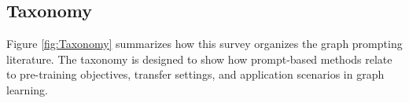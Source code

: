 





\subsection{Taxonomy}

Figure \ref{fig:Taxonomy} summarizes how this survey organizes the graph prompting literature. The taxonomy is designed to show how prompt-based methods relate to pre-training objectives, transfer settings, and application scenarios in graph learning.



